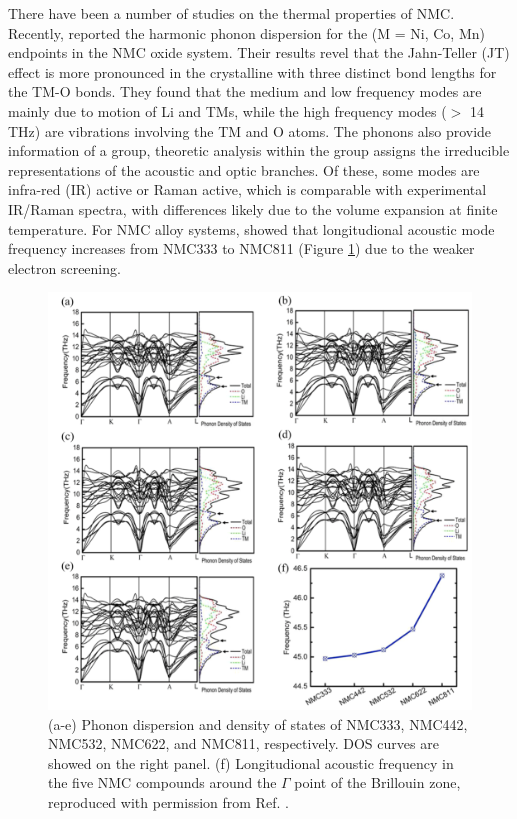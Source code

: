 \documentclass[journal=jacsat,manuscript=article]{achemso}
\begin{document}
There have been a number of studies on the thermal properties of NMC. 
Recently, \citeauthor{yang2020chemical} reported the harmonic phonon dispersion for the  (M = Ni, Co, Mn) endpoints in the NMC oxide system. \cite{yang2020chemical}
Their results revel that the Jahn-Teller (JT) effect is more pronounced in the crystalline  with three distinct bond lengths for the TM-O bonds. They found that the medium and low frequency modes are mainly due to motion of Li and TMs, while the high frequency modes ($>$ 14 THz) are vibrations involving the TM and O atoms.
The phonons also provide information of a group, theoretic analysis within the group assigns the irreducible representations of the acoustic and optic branches. Of these, some modes are infra-red (IR) active or Raman active, which is comparable with experimental IR/Raman spectra, with differences likely due to the volume expansion at finite temperature. \cite{yang2019highly} 
For NMC alloy systems, \citeauthor{sun_electronic_2017} showed that longitudional acoustic mode frequency increases from NMC333 to NMC811 (Figure \ref{figure_phonon}) due to the weaker electron screening.\cite{sun_electronic_2017}

\begin{figure}[]
  \centering
    \includegraphics[width=15cm]{Figures/P_phonon.png}
    \caption{(a-e) Phonon dispersion and density of states of NMC333, NMC442, NMC532, NMC622, and NMC811, respectively. DOS curves are showed on the right panel. (f) Longitudional acoustic frequency in the five NMC compounds around the $\Gamma$ point of the Brillouin zone, reproduced with permission from Ref. .}
  \label{figure_phonon}
\end{figure}
\end{document}
